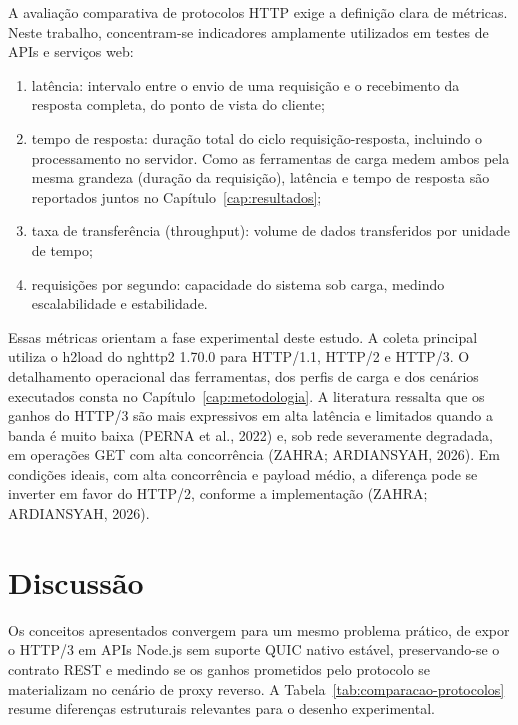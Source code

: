 A avaliação comparativa de protocolos HTTP exige a definição clara de métricas. Neste trabalho, concentram-se indicadores amplamente utilizados em testes de APIs e serviços web:

\begin{enumerate}[label=\alph*)]
\item latência: intervalo entre o envio de uma requisição e o recebimento da resposta completa, do ponto de vista do cliente;
\item tempo de resposta: duração total do ciclo requisição-resposta, incluindo o processamento no servidor. Como as ferramentas de carga medem ambos pela mesma grandeza (duração da requisição), latência e tempo de resposta são reportados juntos no Capítulo~\ref{cap:resultados};
\item taxa de transferência (throughput): volume de dados transferidos por unidade de tempo\allowbreak{};
\item requisições por segundo: capacidade do sistema sob carga, medindo escalabilidade e estabilidade.
\end{enumerate}

Essas métricas orientam a fase experimental deste estudo. A coleta principal utiliza o h2load do nghttp2 1.70.0 para HTTP/1.1, HTTP/2 e HTTP/3. O detalhamento operacional das ferramentas, dos perfis de carga e dos cenários executados consta no Capítulo~\ref{cap:metodologia}. A literatura ressalta que os ganhos do HTTP/3 são mais expressivos em alta latência e limitados quando a banda é muito baixa (PERNA et al., 2022) e, sob rede severamente degradada, em operações GET com alta concorrência (ZAHRA; ARDIANSYAH, 2026). Em condições ideais, com alta concorrência e payload médio, a diferença pode se inverter em favor do HTTP/2, conforme a implementação (ZAHRA; ARDIANSYAH, 2026).

\section{Discussão}

Os conceitos apresentados convergem para um mesmo problema prático, de expor o HTTP/3 em APIs Node.js sem suporte QUIC nativo estável, preservando-se o contrato REST e medindo se os ganhos prometidos pelo protocolo se materializam no cenário de proxy reverso. A Tabela~\ref{tab:comparacao-protocolos} resume diferenças estruturais relevantes para o desenho experimental.

